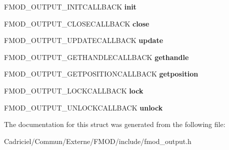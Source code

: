 \begin{DoxyCompactItemize}
\item 
\hypertarget{struct_f_m_o_d___o_u_t_p_u_t___d_e_s_c_r_i_p_t_i_o_n_a16015d5d334e75322b95adebaac20139}{F\-M\-O\-D\-\_\-\-O\-U\-T\-P\-U\-T\-\_\-\-I\-N\-I\-T\-C\-A\-L\-L\-B\-A\-C\-K {\bfseries init}}\label{struct_f_m_o_d___o_u_t_p_u_t___d_e_s_c_r_i_p_t_i_o_n_a16015d5d334e75322b95adebaac20139}

\item 
\hypertarget{struct_f_m_o_d___o_u_t_p_u_t___d_e_s_c_r_i_p_t_i_o_n_a5e0e9b99b7b8011bb248e58ad82b4fa8}{F\-M\-O\-D\-\_\-\-O\-U\-T\-P\-U\-T\-\_\-\-C\-L\-O\-S\-E\-C\-A\-L\-L\-B\-A\-C\-K {\bfseries close}}\label{struct_f_m_o_d___o_u_t_p_u_t___d_e_s_c_r_i_p_t_i_o_n_a5e0e9b99b7b8011bb248e58ad82b4fa8}

\item 
\hypertarget{struct_f_m_o_d___o_u_t_p_u_t___d_e_s_c_r_i_p_t_i_o_n_a3c61df7f0da61edd058317a0966c04bf}{F\-M\-O\-D\-\_\-\-O\-U\-T\-P\-U\-T\-\_\-\-U\-P\-D\-A\-T\-E\-C\-A\-L\-L\-B\-A\-C\-K {\bfseries update}}\label{struct_f_m_o_d___o_u_t_p_u_t___d_e_s_c_r_i_p_t_i_o_n_a3c61df7f0da61edd058317a0966c04bf}

\item 
\hypertarget{struct_f_m_o_d___o_u_t_p_u_t___d_e_s_c_r_i_p_t_i_o_n_a2029938a3daf763ac99e971bf0a4ce40}{F\-M\-O\-D\-\_\-\-O\-U\-T\-P\-U\-T\-\_\-\-G\-E\-T\-H\-A\-N\-D\-L\-E\-C\-A\-L\-L\-B\-A\-C\-K {\bfseries gethandle}}\label{struct_f_m_o_d___o_u_t_p_u_t___d_e_s_c_r_i_p_t_i_o_n_a2029938a3daf763ac99e971bf0a4ce40}

\item 
\hypertarget{struct_f_m_o_d___o_u_t_p_u_t___d_e_s_c_r_i_p_t_i_o_n_ae8b8332e832ea9d12c45a48dd0481e9e}{F\-M\-O\-D\-\_\-\-O\-U\-T\-P\-U\-T\-\_\-\-G\-E\-T\-P\-O\-S\-I\-T\-I\-O\-N\-C\-A\-L\-L\-B\-A\-C\-K {\bfseries getposition}}\label{struct_f_m_o_d___o_u_t_p_u_t___d_e_s_c_r_i_p_t_i_o_n_ae8b8332e832ea9d12c45a48dd0481e9e}

\item 
\hypertarget{struct_f_m_o_d___o_u_t_p_u_t___d_e_s_c_r_i_p_t_i_o_n_a906c1cdb6636db105538db27b48cc513}{F\-M\-O\-D\-\_\-\-O\-U\-T\-P\-U\-T\-\_\-\-L\-O\-C\-K\-C\-A\-L\-L\-B\-A\-C\-K {\bfseries lock}}\label{struct_f_m_o_d___o_u_t_p_u_t___d_e_s_c_r_i_p_t_i_o_n_a906c1cdb6636db105538db27b48cc513}

\item 
\hypertarget{struct_f_m_o_d___o_u_t_p_u_t___d_e_s_c_r_i_p_t_i_o_n_adeb7eea407c7b5b167d0cd30c6ef4a9f}{F\-M\-O\-D\-\_\-\-O\-U\-T\-P\-U\-T\-\_\-\-U\-N\-L\-O\-C\-K\-C\-A\-L\-L\-B\-A\-C\-K {\bfseries unlock}}\label{struct_f_m_o_d___o_u_t_p_u_t___d_e_s_c_r_i_p_t_i_o_n_adeb7eea407c7b5b167d0cd30c6ef4a9f}

\end{DoxyCompactItemize}


The documentation for this struct was generated from the following file\-:\begin{DoxyCompactItemize}
\item 
Cadriciel/\-Commun/\-Externe/\-F\-M\-O\-D/include/fmod\-\_\-output.\-h\end{DoxyCompactItemize}
